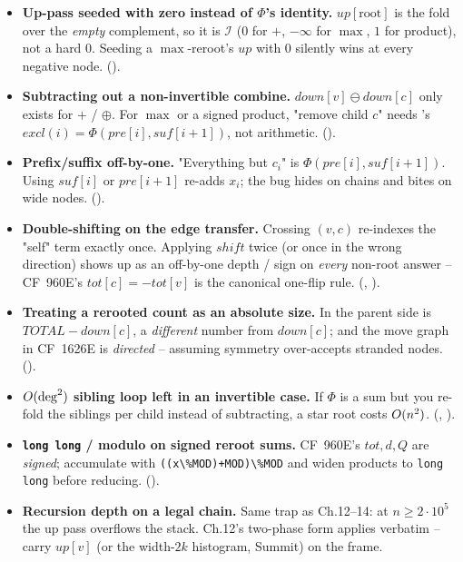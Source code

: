 \begin{itemize}[nosep, leftmargin=1.4em]
  \item \textbf{Up-pass seeded with zero instead of $\Phi$'s identity.}
        $\mathit{up}[\text{root}]$ is the fold over the \emph{empty} complement,
        so it is $\mathcal{I}$ ($0$ for $+$, $-\infty$ for $\max$, $1$ for product),
        not a hard $0$. Seeding a $\max$-reroot's $\mathit{up}$ with $0$ silently
        wins at every negative node. ().
  \item \textbf{Subtracting out a non-invertible combine.} $\mathit{down}[v]\ominus
        \mathit{down}[c]$ only exists for $+$ / $\oplus$. For $\max$ or a
        signed product, "remove child $c$" needs 's
        $\mathit{excl}(i)=\Phi(\mathit{pre}[i],\mathit{suf}[i{+}1])$, not arithmetic.
        ().
  \item \textbf{Prefix/suffix off-by-one.} "Everything but $c_i$" is
        $\Phi(\mathit{pre}[i],\mathit{suf}[i{+}1])$. Using $\mathit{suf}[i]$ or
        $\mathit{pre}[i{+}1]$ re-adds $x_i$; the bug hides on chains and bites on
        wide nodes. ().
  \item \textbf{Double-shifting on the edge transfer.} Crossing $(v,c)$ re-indexes
        the "self" term exactly once. Applying $\mathit{shift}$ twice (or once in
        the wrong direction) shows up as an off-by-one depth / sign on \emph{every}
        non-root answer -- CF~960E's $\mathit{tot}[c]=-\mathit{tot}[v]$ is the
        canonical one-flip rule. (,
        ).
  \item \textbf{Treating a rerooted count as an absolute size.} In
         the parent side is $\mathit{TOTAL}-\mathit{down}[c]$,
        a \emph{different} number from $\mathit{down}[c]$; and the move graph in
        CF~1626E is \emph{directed} -- assuming symmetry over-accepts stranded nodes.
        ().
  \item \textbf{$O(\deg^2)$ sibling loop left in an invertible case.} If
        $\Phi$ is a sum but you re-fold the siblings per child instead of
        subtracting, a star root costs $O(n^2)$. (,
        ).
  \item \textbf{\lstinline{long long} / modulo on signed reroot sums.} CF~960E's
        $\mathit{tot},d,Q$ are \emph{signed}; accumulate with
        \lstinline{((x\%MOD)+MOD)\%MOD} and widen products to \lstinline{long long}
        before reducing. ().
  \item \textbf{Recursion depth on a legal chain.} Same trap as Ch.12--14: at
        $n\ge2\cdot10^{5}$ the up pass overflows the stack. Ch.12's
         two-phase form applies verbatim -- carry
        $\mathit{up}[v]$ (or the width-$2k$ histogram, Summit) on the frame.
\end{itemize}

